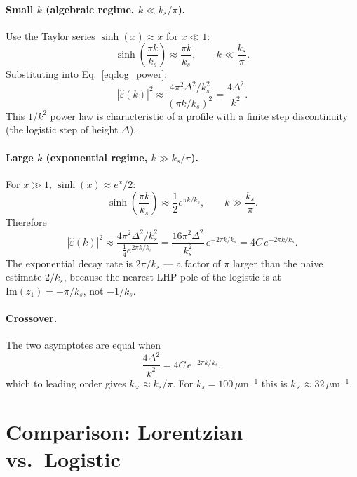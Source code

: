 \documentclass[11pt]{article}
\newcommand{\kk}{k_s}
\newcommand{\epsh}{\hat{\varepsilon}}
\begin{document}
\paragraph{Small $k$ (algebraic regime, $k \ll \kk/\pi$).}
Use the Taylor series $\sinh(x)\approx x$ for $x\ll 1$:
\begin{equation}
    \sinh\!\left(\frac{\pi k}{\kk}\right) \approx \frac{\pi k}{\kk},
    \qquad k \ll \frac{\kk}{\pi}.
\end{equation}
Substituting into Eq.~\eqref{eq:log_power}:
\begin{equation}
    |\epsh(k)|^2 \approx
        \frac{4\pi^2\Delta^2/\kk^2}{(\pi k/\kk)^2}
    = \frac{4\Delta^2}{k^2}.
\end{equation}
This $1/k^2$ power law is characteristic of a profile with a finite step
discontinuity (the logistic step of height $\Delta$).

\paragraph{Large $k$ (exponential regime, $k \gg \kk/\pi$).}
For $x\gg 1$, $\sinh(x)\approx e^x/2$:
\begin{equation}
    \sinh\!\left(\frac{\pi k}{\kk}\right) \approx \frac{1}{2}e^{\pi k/\kk},
    \qquad k \gg \frac{\kk}{\pi}.
\end{equation}
Therefore
\begin{equation}
    |\epsh(k)|^2 \approx
        \frac{4\pi^2\Delta^2/\kk^2}{\tfrac{1}{4}e^{2\pi k/\kk}}
    = \frac{16\pi^2\Delta^2}{\kk^2}\,e^{-2\pi k/\kk}
    = 4C\,e^{-2\pi k/\kk}.
\end{equation}
The exponential decay rate is $2\pi/\kk$ — a factor of $\pi$ larger
than the naive estimate $2/\kk$, because the nearest LHP pole of the
logistic is at $\mathrm{Im}(z_1) = -\pi/\kk$, not $-1/\kk$.

\paragraph{Crossover.}
The two asymptotes are equal when
\begin{equation}
    \frac{4\Delta^2}{k^2} = 4C\,e^{-2\pi k/\kk},
\end{equation}
which to leading order gives $k_{\times} \approx \kk/\pi$.
For $\kk=100\,\mu\mathrm{m}^{-1}$ this is $k_{\times}\approx 32\,\mu\mathrm{m}^{-1}$.

\section{Comparison: Lorentzian vs.\ Logistic}
\end{document}
